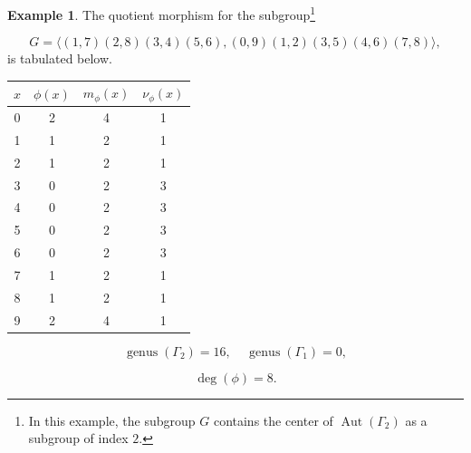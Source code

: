 \documentclass[12pt,letterpaper]{article}
\theoremstyle{definition}
\newtheorem{example}[theorem]{Example}
\DeclareMathOperator{\Aut}{Aut}
\DeclareMathOperator{\genus}{genus}
\begin{document}
\begin{example}
{The quotient morphism for the
subgroup\footnote{In this example, the subgroup $G$
contains the center of $\Aut(\Gamma_2)$ as a subgroup of index $2$.}

\[
G=\langle (1,7)(2,8)(3,4)(5,6), (0,9)(1,2)(3,5)(4,6)(7,8) \rangle,
\]
is tabulated below. 

\begin{center}
\begin{tabular}{c|c|c|c}  
  $x$ & $\phi(x)$ & $m_\phi(x)$ & $\nu_\phi(x)$ \\ \hline
  0   &    2   &        4         &  1   \\ 
  1   &    1   &        2         &  1  \\ 
  2   &    1   &        2         &  1  \\ 
  3   &    0   &        2         &  3  \\ 
  4   &    0   &        2         &  3   \\ 
  5   &    0   &        2         &  3    \\ 
  6   &    0   &        2         &  3   \\ 
  7   &    1   &        2         &  1   \\
  8   &    1   &        2         &  1   \\
  9   &    2   &        4         &  1   \\
\end{tabular}
\end{center}

\[
  \genus(\Gamma_2) =16,\ \ \ \ \
  \genus(\Gamma_1) =0,
\]

\[
\deg(\phi) =8.
\]


}
\end{example}
\end{document}
